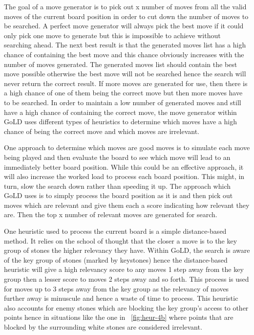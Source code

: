 \documentclass{l4proj}
\begin{document}
The goal of a move generator is to pick out x number of moves from all the valid moves of the current board position in order to cut down the number of moves to be searched. A perfect move generator will always pick the best move if it could only pick one move to generate but this is impossible to achieve without searching ahead.  The next best result is that the generated moves list has a high chance of containing the best move and this chance obviously increases with the number of moves generated. The generated moves list should contain the best move possible otherwise the best move will not be searched hence the search will never return the correct result. If more moves are generated for use, then there is a high chance of one of them being the correct move but then more moves have to be searched. In order to maintain a low number of generated moves and still have a high chance of containing the correct move, the move generator within GoLD uses different types of heuristics to determine which moves have a high chance of being the correct move and which moves are irrelevant.

One approach to determine which moves are good moves is to simulate each move being played and then evaluate the board to see which move will lead to an immediately better board position. While this could be an effective approach, it will also increase the worked load to process each board position. This might, in turn, slow the search down rather than speeding it up. The approach which GoLD uses is to simply process the board position as it is and then pick out moves which are relevant and give them each a score indicating how relevant they are.  Then the top x number of relevant moves are generated for search.

One heuristic used to process the current board is a simple distance-based method. It relies on the school of thought that the closer a move is to the key group of stones the higher relevancy they have. Within GoLD, the search is aware of the key group of stones (marked by keystones) hence the distance-based heuristic will give a high relevancy score to any moves 1 step away from the key group then a lesser score to moves 2 steps away and so forth. This process is used for moves up to 3 steps away from the key group as the relevancy of moves further away is minuscule and hence a waste of time to process. This heuristic also accounts for enemy stones which are blocking the key group's access to other points hence in situations like the one in ~\autoref{fig:heur-4b} where points that are blocked by the surrounding white stones are considered irrelevant.
\end{document}

